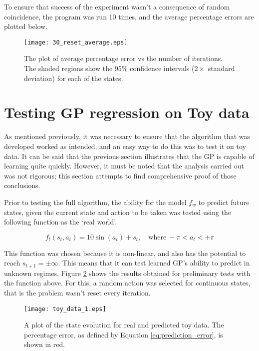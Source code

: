 To ensure that success of the experiment wasn't a consequence of random coincidence, the program was run 10 times, and the average percentage errors are plotted below.

\begin{figure}[H] \centering \scalebox{0.45} {\texttt{[image: 30\_reset\_average.eps]}}\caption{The plot of average percentage error vs the number of iterations. The shaded regions show the 95\% confidence intervals ($2 \times$ standard deviation) for each of the states.}\label{fig:100_reset_1}
\end{figure}

\section{Testing GP regression on Toy data} \label{sec:toy_data_intro}

As mentioned previously, it was necessary to ensure that the algorithm that was developed worked as intended, and an easy way to do this was to test it on toy data. It can be said that the previous section illustrates that the GP is capable of learning quite quickly. However, it must be noted that the analysis carried out was not rigorous; this section attempts to find comprehensive proof of those conclusions. 

Prior to testing the full algorithm, the ability for the model $f_w$ to predict future states, given the current state and action to be taken was tested using the following function as the `real world'.  

\begin{equation} \label{toy_data_function} f_t(s_t,a_t) = 10\sin(a_t) + s_t, \quad \mathrm{where} \: -\pi < a_t < +\pi   \end{equation}

This function was chosen because it is non-linear, and also has the potential to reach $s_{t+1} = \pm \infty$. This means that it can test learned GP's ability to predict in unknown regimes. Figure \ref{fig:toy_data_1} shows the results obtained for preliminary tests with the function above. For this, a random action was selected for continuous states, that is the problem wasn't reset every iteration.

\begin{figure}[H] \centering \scalebox{0.5} {\texttt{[image: toy\_data\_1.eps]}}\caption{A plot of the state evolution for real and predicted toy data. The percentage error, as defined by Equation \ref{eq:prediction_error}, is shown in red.}\label{fig:toy_data_1}
\end{figure}

